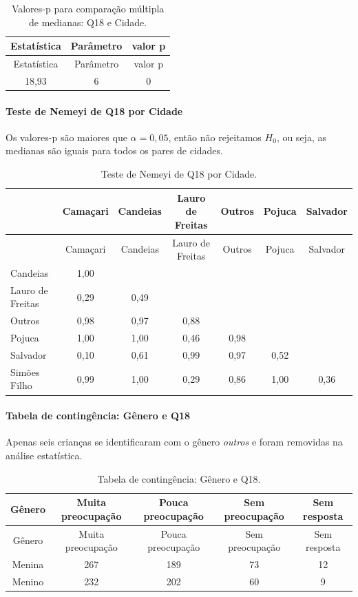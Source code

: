 \documentclass[]{article}
\let\oldparagraph\paragraph
\renewcommand{\paragraph}[1]{\oldparagraph{#1}\mbox{}}
\begin{document}
\begin{longtable}[]{@{}ccc@{}}
\caption{\label{tab:unnamed-chunk-224}Valores-p para comparação múltipla de medianas: Q18 e Cidade.}\tabularnewline
\toprule
Estatística & Parâmetro & valor p\tabularnewline
\midrule
\endfirsthead
\toprule
Estatística & Parâmetro & valor p\tabularnewline
\midrule
\endhead
18,93 & 6 & 0\tabularnewline
\bottomrule
\end{longtable}

\hypertarget{teste-de-nemeyi-de-q18-por-cidade}{%
\paragraph{Teste de Nemeyi de Q18 por Cidade}\label{teste-de-nemeyi-de-q18-por-cidade}}

Os valores-p são maiores que \(\alpha=0,05\), então não rejeitamos \(H_0\), ou seja, as medianas são iguais para todos os pares de cidades.

\begin{longtable}[]{@{}lcccccc@{}}
\caption{\label{tab:unnamed-chunk-225}Teste de Nemeyi de Q18 por Cidade.}\tabularnewline
\toprule
& Camaçari & Candeias & Lauro de Freitas & Outros & Pojuca & Salvador\tabularnewline
\midrule
\endfirsthead
\toprule
& Camaçari & Candeias & Lauro de Freitas & Outros & Pojuca & Salvador\tabularnewline
\midrule
\endhead
Candeias & 1,00 & & & & &\tabularnewline
Lauro de Freitas & 0,29 & 0,49 & & & &\tabularnewline
Outros & 0,98 & 0,97 & 0,88 & & &\tabularnewline
Pojuca & 1,00 & 1,00 & 0,46 & 0,98 & &\tabularnewline
Salvador & 0,10 & 0,61 & 0,99 & 0,97 & 0,52 &\tabularnewline
Simões Filho & 0,99 & 1,00 & 0,29 & 0,86 & 1,00 & 0,36\tabularnewline
\bottomrule
\end{longtable}

\cleardoublepage

\hypertarget{tabela-de-continguxeancia-guxeanero-e-q18}{%
\paragraph{Tabela de contingência: Gênero e Q18}\label{tabela-de-continguxeancia-guxeanero-e-q18}}

Apenas seis crianças se identificaram com o gênero \emph{outros} e foram removidas na análise estatística.

\begin{longtable}[]{@{}ccccc@{}}
\caption{\label{tab:unnamed-chunk-226}Tabela de contingência: Gênero e Q18.}\tabularnewline
\toprule
Gênero & Muita preocupação & Pouca preocupação & Sem preocupação & Sem resposta\tabularnewline
\midrule
\endfirsthead
\toprule
Gênero & Muita preocupação & Pouca preocupação & Sem preocupação & Sem resposta\tabularnewline
\midrule
\endhead
Menina & 267 & 189 & 73 & 12\tabularnewline
Menino & 232 & 202 & 60 & 9\tabularnewline
\bottomrule
\end{longtable}
\end{document}
